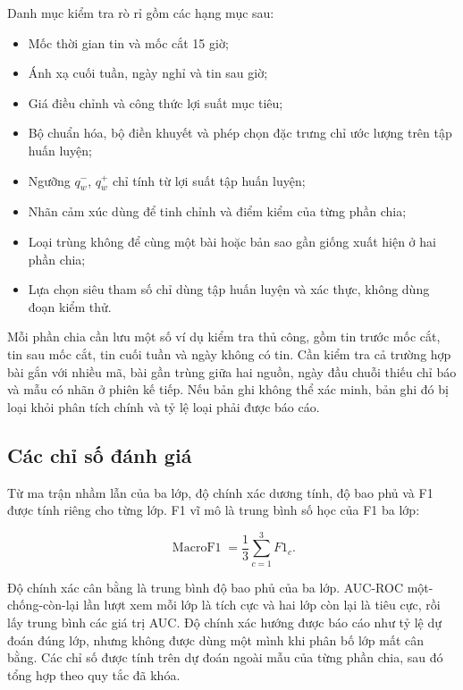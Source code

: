 Danh mục kiểm tra rò rỉ gồm các hạng mục sau:

\begin{itemize}[nosep]
  \item Mốc thời gian tin và mốc cắt 15 giờ;
  \item Ánh xạ cuối tuần, ngày nghỉ và tin sau giờ;
  \item Giá điều chỉnh và công thức lợi suất mục tiêu;
  \item Bộ chuẩn hóa, bộ điền khuyết và phép chọn đặc trưng chỉ ước lượng trên tập huấn luyện;
  \item Ngưỡng $q^-_w$, $q^+_w$ chỉ tính từ lợi suất tập huấn luyện;
  \item Nhãn cảm xúc dùng để tinh chỉnh và điểm kiểm của từng phần chia;
  \item Loại trùng không để cùng một bài hoặc bản sao gần giống xuất hiện ở hai phần chia;
  \item Lựa chọn siêu tham số chỉ dùng tập huấn luyện và xác thực, không dùng đoạn kiểm thử.
\end{itemize}

Mỗi phần chia cần lưu một số ví dụ kiểm tra thủ công, gồm tin trước mốc cắt, tin sau
mốc cắt, tin cuối tuần và ngày không có tin. Cần kiểm tra cả trường hợp bài gắn với
nhiều mã, bài gần trùng giữa hai nguồn, ngày đầu chuỗi thiếu chỉ báo và mẫu có nhãn
ở phiên kế tiếp. Nếu bản ghi không thể xác minh, bản ghi đó bị loại khỏi phân tích
chính và tỷ lệ loại phải được báo cáo.

\subsection{Các chỉ số đánh giá}

Từ ma trận nhầm lẫn của ba lớp, độ chính xác dương tính, độ bao phủ và F1 được tính
riêng cho từng lớp. F1 vĩ mô là trung bình số học của F1 ba lớp:

\begin{equation}
  \operatorname{MacroF1}=\frac{1}{3}\sum_{c=1}^{3}F1_c.
  \label{eq:macro-f1}
\end{equation}

Độ chính xác cân bằng là trung bình độ bao phủ của ba lớp. AUC-ROC một-chống-còn-lại
lần lượt xem mỗi lớp là tích cực và hai lớp còn lại là tiêu cực, rồi lấy trung bình
các giá trị AUC. Độ chính xác hướng được báo cáo như tỷ lệ dự đoán đúng lớp, nhưng
không được dùng một mình khi phân bố lớp mất cân bằng. Các chỉ số được tính trên dự
đoán ngoài mẫu của từng phần chia, sau đó tổng hợp theo quy tắc đã khóa.

